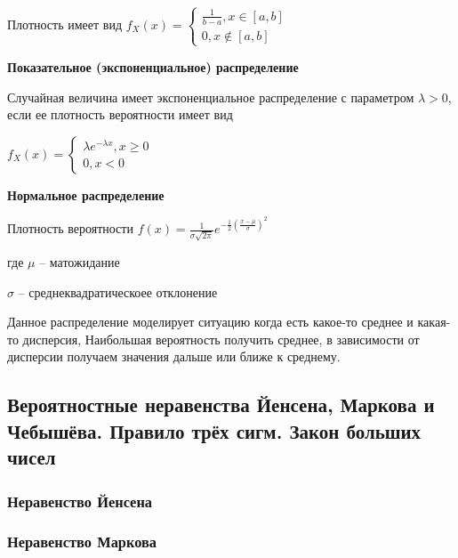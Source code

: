 \documentclass{article}
\begin{document}
Плотность имеет вид $f_X(x) = \begin{cases}
\frac{1}{b - a}, x \in [a, b]\\
0, x \not\in [a, b]
\end{cases}$

{\bf Показательное (экспоненциальное) распределение}

Случайная величина имеет экспоненциальное распределение с параметром $\lambda > 0$, если ее плотность вероятности имеет вид

$f_X(x) = \begin{cases}
\lambda e^{-\lambda x}, x \ge 0\\
0, x < 0
\end{cases}$

{\bf Нормальное распределение}


Плотность вероятности $f(x) = \frac{1}{\sigma \sqrt{2 \pi}}e^{-\frac{1}{2}(\frac{x - \mu}{\sigma})^2}$

где $\mu$ -- матожидание

$\sigma$ -- среднеквадратическоее отклонение

Данное распределение моделирует ситуацию когда есть какое-то среднее и какая-то дисперсия, Наибольшая вероятность получить среднее, в зависимости от дисперсии получаем значения дальше или ближе к среднему.


\subsection{Вероятностные неравенства Йенсена, Маркова и Чебышёва. Правило трёх сигм. Закон больших чисел}

\subsubsection{Неравенство Йенсена}


\subsubsection{Неравенство Маркова}

\end{document}
